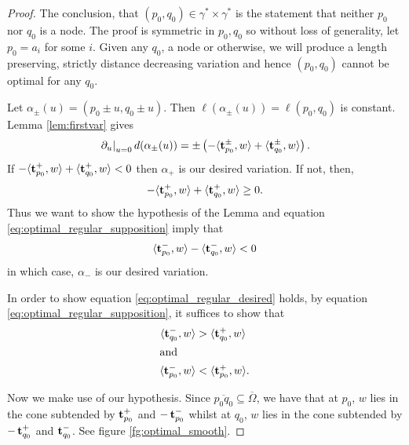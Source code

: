 \documentclass[11pt]{amsart}
\begin{document}
\begin{proof}

The conclusion, that \((p_0, q_0) \in \gamma^{\ast} \times \gamma^{\ast}\) is the statement that neither \(p_0\) nor \(q_0\) is a node. The proof is symmetric in \(p_0, q_0\) so without loss of generality, let \(p_0 = a_i\) for some \(i\). Given any \(q_0\), a node or otherwise, we will produce a length preserving, strictly distance decreasing variation and hence \((p_0, q_0)\) cannot be optimal for any \(q_0\).

Let \(\alpha_{\pm} (u) = (p_0 \pm u, q_0 \pm u)\). Then \(\ell(\alpha_{\pm} (u)) = \ell(p_0, q_0)\) is constant. Lemma \ref{lem:firstvar} gives
\[
\left.\partial_u\right|_{u=0} d (\alpha_{\pm} (u)) = \pm \left(-\langle{\operatorname{\mathbf{t}}^{\pm}_{p_0}},{w}\rangle + \langle{\operatorname{\mathbf{t}}^{\pm}_{q_0}},{w}\rangle\right).
\]
If \(-\langle{\operatorname{\mathbf{t}}_{p_0}^+},{w}\rangle + \langle{\operatorname{\mathbf{t}}_{q_0}^+},{w}\rangle < 0\) then $\alpha_+$ is our desired variation. If not, then,
\begin{equation}
\label{eq:optimal_regular_supposition}
-\langle{\operatorname{\mathbf{t}}_{p_0}^+},{w}\rangle + \langle{\operatorname{\mathbf{t}}_{q_0}^+},{w}\rangle \geq 0.
\end{equation}
Thus we want to show the hypothesis of the Lemma and equation \eqref{eq:optimal_regular_supposition} imply that
\begin{equation}
\label{eq:optimal_regular_desired}
\langle{\operatorname{\mathbf{t}}_{p_0}^-},{w}\rangle - \langle{\operatorname{\mathbf{t}}_{q_0}^-},{w}\rangle < 0
\end{equation}
in which case, $\alpha_-$ is our desired variation.

In order to show equation \eqref{eq:optimal_regular_desired} holds, by equation \eqref{eq:optimal_regular_supposition}, it suffices to show that
\begin{align}
\label{eq:optimal_regular_q}
\langle{\operatorname{\mathbf{t}}_{q_0}^-},{w}\rangle &> \langle{\operatorname{\mathbf{t}}_{q_0}^+},{w}\rangle \\
\intertext{and}
\label{eq:optimal_regular_p}
\langle{\operatorname{\mathbf{t}}_{p_0}^-},{w}\rangle &< \langle{\operatorname{\mathbf{t}}_{p_0}^+ },{w}\rangle.
\end{align}

Now we make use of our hypothesis. Since \(\overline{p_0q_0} \subseteq \overline{\Omega}\), we have that at \(p_0\), \(w\) lies in the cone subtended by \(\operatorname{\mathbf{t}}_{p_0}^+\) and \(-\operatorname{\mathbf{t}}_{p_0}^-\) whilst at \(q_0\), \(w\) lies in the cone subtended by \(-\operatorname{\mathbf{t}}_{q_0}^+\) and \(\operatorname{\mathbf{t}}_{q_0}^-\). See figure \ref{fg:optimal_smooth}.


\end{proof}
\end{document}
